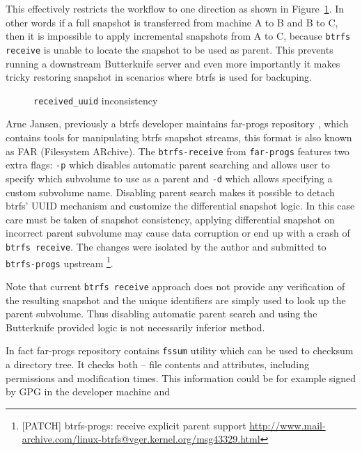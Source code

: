 \documentclass[a4paper,11pt]{kth-mag}
\begin{document}
This effectively restricts the workflow to one direction
as shown in Figure~\ref{fig:btrfs-received-uuid-issue}.
In other words if a full snapshot is transferred
from machine A to B and B to C, then it is impossible
to apply incremental snapshots from A to C, because
\lstinline!btrfs receive! is unable to locate the snapshot
to be used as parent.
This prevents running a downstream Butterknife server and
even more importantly it makes tricky restoring snapshot
in scenarios where \acrshort{btrfs} is used for backuping.

\begin{figure}[!htb]
\centering
\scalebox{0.5}{}
\caption{\lstinline!received_uuid! inconsistency}
\label{fig:btrfs-received-uuid-issue}
\end{figure}

Arne Jansen, previously a \acrshort{btrfs} developer maintains far-progs repository
\cite{far-progs},
which contains tools for manipulating \acrshort{btrfs} snapshot streams,
this format is also known as FAR (Filesystem ARchive).
The \lstinline!btrfs-receive! from \lstinline!far-progs! features
two extra flags: \lstinline!-p! which disables
automatic parent searching and allows user to specify which
subvolume to use as a parent and \lstinline!-d! which
allows specifying a custom subvolume name.
Disabling parent search makes it possible to detach
\acrshort{btrfs}' UUID mechanism and customize the differential snapshot logic.
In this case care must be taken of snapshot consistency,
applying differential snapshot on incorrect parent subvolume
may cause data corruption or end up with a crash
of \lstinline!btrfs receive!.
The changes were isolated by the author and
submitted to \lstinline!btrfs-progs! upstream
\footnote{
[PATCH] btrfs-progs: receive explicit parent support
\url{http://www.mail-archive.com/linux-btrfs@vger.kernel.org/msg43329.html}}.

Note that current \lstinline!btrfs receive! approach does not provide
any verification of the resulting snapshot and the unique
identifiers are simply used to look up the parent subvolume.
Thus disabling automatic parent search and
using the Butterknife provided logic
is not necessarily inferior method.

In fact far-progs repository contains \lstinline!fssum!
utility which can be used to checksum a directory tree.
It checks both -- file contents and attributes,
including permissions and modification times.
This information could be for example signed by GPG
in the developer machine and
\end{document}
